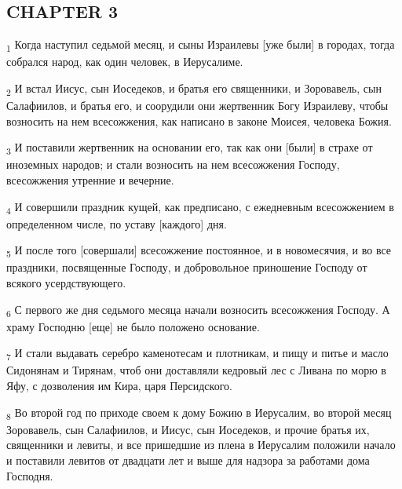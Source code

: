 \subsection{CHAPTER 3}
\begin{tcolorbox}
\textsubscript{1} Когда наступил седьмой месяц, и сыны Израилевы [уже были] в городах, тогда собрался народ, как один человек, в Иерусалиме.
\end{tcolorbox}
\begin{tcolorbox}
\textsubscript{2} И встал Иисус, сын Иоседеков, и братья его священники, и Зоровавель, сын Салафиилов, и братья его, и соорудили они жертвенник Богу Израилеву, чтобы возносить на нем всесожжения, как написано в законе Моисея, человека Божия.
\end{tcolorbox}
\begin{tcolorbox}
\textsubscript{3} И поставили жертвенник на основании его, так как они [были] в страхе от иноземных народов; и стали возносить на нем всесожжения Господу, всесожжения утренние и вечерние.
\end{tcolorbox}
\begin{tcolorbox}
\textsubscript{4} И совершили праздник кущей, как предписано, с ежедневным всесожжением в определенном числе, по уставу [каждого] дня.
\end{tcolorbox}
\begin{tcolorbox}
\textsubscript{5} И после того [совершали] всесожжение постоянное, и в новомесячия, и во все праздники, посвященные Господу, и добровольное приношение Господу от всякого усердствующего.
\end{tcolorbox}
\begin{tcolorbox}
\textsubscript{6} С первого же дня седьмого месяца начали возносить всесожжения Господу. А храму Господню [еще] не было положено основание.
\end{tcolorbox}
\begin{tcolorbox}
\textsubscript{7} И стали выдавать серебро каменотесам и плотникам, и пищу и питье и масло Сидонянам и Тирянам, чтоб они доставляли кедровый лес с Ливана по морю в Яфу, с дозволения им Кира, царя Персидского.
\end{tcolorbox}
\begin{tcolorbox}
\textsubscript{8} Во второй год по приходе своем к дому Божию в Иерусалим, во второй месяц Зоровавель, сын Салафиилов, и Иисус, сын Иоседеков, и прочие братья их, священники и левиты, и все пришедшие из плена в Иерусалим положили начало и поставили левитов от двадцати лет и выше для надзора за работами дома Господня.
\end{tcolorbox}
